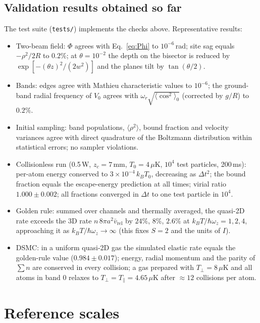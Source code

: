 \documentclass[11pt,a4paper]{article}
\begin{document}
\subsection{Validation results obtained so far}
The test suite (\texttt{tests/}) implements the checks above. Representative results:
\begin{itemize}[leftmargin=*]
\item Two-beam field: $\Phi$ agrees with Eq.~\eqref{eq:Phi} to $10^{-6}$\,rad; site sag equals $-\rho^2/2R$ to $0.2\%$; at $\theta=10^{-2}$ the depth on the bisector is reduced by $\exp[-(\theta z)^2/(2w^2)]$ and the planes tilt by $\tan(\theta/2)$.
\item Bands: edges agree with Mathieu characteristic values to $10^{-6}$; the ground-band radial frequency of $V_0$ agrees with $\omega_r\sqrt{\langle\cos^2\rangle_0}$ (corrected by $g/R$) to $0.2\%$.
\item Initial sampling: band populations, $\langle\rho^2\rangle$, bound fraction and velocity variances agree with direct quadrature of the Boltzmann distribution within statistical errors; no sampler violations.
\item Collisionless run (0.5\,W, $z_c=7$\,mm, $T_0=4\,\mu$K, $10^4$ test particles, 200\,ms): per-atom energy conserved to $3\times10^{-4}\,k_BT_0$, decreasing as $\Delta t^2$; the bound fraction equals the escape-energy prediction at all times; virial ratio $1.000\pm0.002$; all fractions converged in $\Delta t$ to one test particle in $10^4$.
\item Golden rule: summed over channels and thermally averaged, the quasi-2D rate exceeds the 3D rate $n\,8\pi a^2\bar v_\mathrm{rel}$ by $24\%$, $8\%$, $2.6\%$ at $k_BT/\hbar\omega_z=1,2,4$, approaching it as $k_BT/\hbar\omega_z\to\infty$ (this fixes $S=2$ and the units of $I$).
\item DSMC: in a uniform quasi-2D gas the simulated elastic rate equals the golden-rule value ($0.984\pm0.017$); energy, radial momentum and the parity of $\sum n$ are conserved in every collision; a gas prepared with $T_\perp=8\,\mu$K and all atoms in band 0 relaxes to $T_\perp=T_\parallel=4.65\,\mu$K after $\approx 12$ collisions per atom.
\end{itemize}

\section{Reference scales}
\label{sec:scales}
\end{document}

